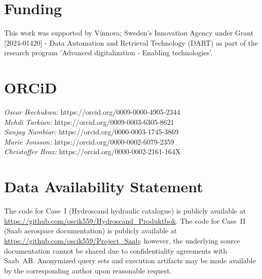 \documentclass[largeformat]{interact}
\begin{document}
\section*{Funding}
\noindent This work was supported by Vinnova; Sweden's Innovation Agency under Grant [2024-01420] - Data Automation and Retrieval Technology (DART) as part of the research program 'Advanced digitalization - Enabling technologies'.
\section*{ORCiD}
\textit{Oscar Ikechukwu:}   https://orcid.org/0009-0000-4905-2344\\
\textit{Mehdi Tarkian:}   https://orcid.org/0009-0003-6305-8621\\
\textit{Sanjay Nambiar:}   https://orcid.org/0000-0003-1745-3869\\
\textit{Marie Jonsson:}  https://orcid.org/0000-0002-6079-2359\\
\textit{Christoffer Brax:}  https://orcid.org/0000-0002-2161-164X
\section*{Data Availability Statement}
\noindent The code for Case~I (Hydroscand hydraulic catalogue) is publicly available at \url{https://github.com/oscik559/Hydroscand_Produktbok}. The code for Case~II (Saab aerospace documentation) is publicly available at \url{https://github.com/oscik559/Project_Saab}; however, the underlying source documentation cannot be shared due to confidentiality agreements with Saab~AB. Anonymized query sets and execution artifacts may be made available by the corresponding author upon reasonable request.


\clearpage
\appendix
\renewcommand{\thesection}{\Alph{section}}
\renewcommand{\thesubsection}{\thesection.\arabic{subsection}}
\renewcommand{\thetable}{\thesection.\arabic{table}}
\setcounter{section}{0}

\newpage
\end{document}
